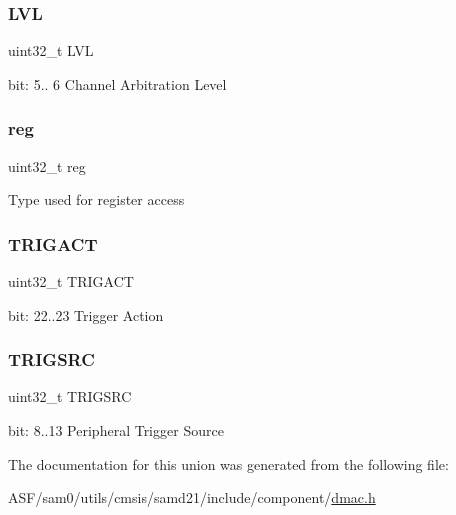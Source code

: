 \subsubsection{\texorpdfstring{LVL}{LVL}}
{\footnotesize\ttfamily uint32\+\_\+t L\+VL}

bit\+: 5.. 6 Channel Arbitration Level \mbox{\label{union_d_m_a_c___c_h_c_t_r_l_b___type_a6b91636401516a477989a336376d7b40}} 
\subsubsection{\texorpdfstring{reg}{reg}}
{\footnotesize\ttfamily uint32\+\_\+t reg}

Type used for register access \mbox{\label{union_d_m_a_c___c_h_c_t_r_l_b___type_a7a54d5ba22711cd05b6b18662851de3c}} 
\subsubsection{\texorpdfstring{TRIGACT}{TRIGACT}}
{\footnotesize\ttfamily uint32\+\_\+t T\+R\+I\+G\+A\+CT}

bit\+: 22..23 Trigger Action \mbox{\label{union_d_m_a_c___c_h_c_t_r_l_b___type_a282c4cf62463a275c204ae9f519d5887}} 
\subsubsection{\texorpdfstring{TRIGSRC}{TRIGSRC}}
{\footnotesize\ttfamily uint32\+\_\+t T\+R\+I\+G\+S\+RC}

bit\+: 8..13 Peripheral Trigger Source 

The documentation for this union was generated from the following file\+:\begin{DoxyCompactItemize}
\item 
A\+S\+F/sam0/utils/cmsis/samd21/include/component/\mbox{\hyperlink{component_2dmac_8h}{dmac.\+h}}\end{DoxyCompactItemize}
